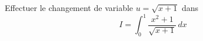 Effectuer le changement de variable $u=\sqrt{x+1}$ dans
\begin{displaymath}
 I=\int_0^{1}\frac{x^2+1}{\sqrt{x+1}}\,dx
\end{displaymath}
\bigskip